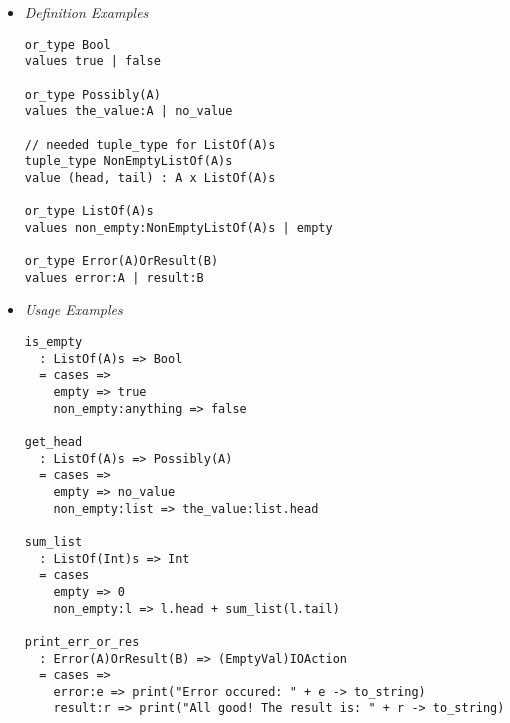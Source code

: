 \documentclass{article}
\begin{document}
\begin{itemize}
\item \textit{Definition Examples}

\begin{verbatim}
or_type Bool
values true | false

or_type Possibly(A)
values the_value:A | no_value

// needed tuple_type for ListOf(A)s
tuple_type NonEmptyListOf(A)s
value (head, tail) : A x ListOf(A)s

or_type ListOf(A)s
values non_empty:NonEmptyListOf(A)s | empty

or_type Error(A)OrResult(B)
values error:A | result:B
\end{verbatim}

\item \textit{Usage Examples}

\begin{verbatim}
is_empty
  : ListOf(A)s => Bool
  = cases => 
    empty => true
    non_empty:anything => false

get_head
  : ListOf(A)s => Possibly(A)
  = cases => 
    empty => no_value
    non_empty:list => the_value:list.head

sum_list
  : ListOf(Int)s => Int
  = cases
    empty => 0
    non_empty:l => l.head + sum_list(l.tail)

print_err_or_res
  : Error(A)OrResult(B) => (EmptyVal)IOAction
  = cases => 
    error:e => print("Error occured: " + e -> to_string)
    result:r => print("All good! The result is: " + r -> to_string)
\end{verbatim}


\end{itemize}
\end{document}
